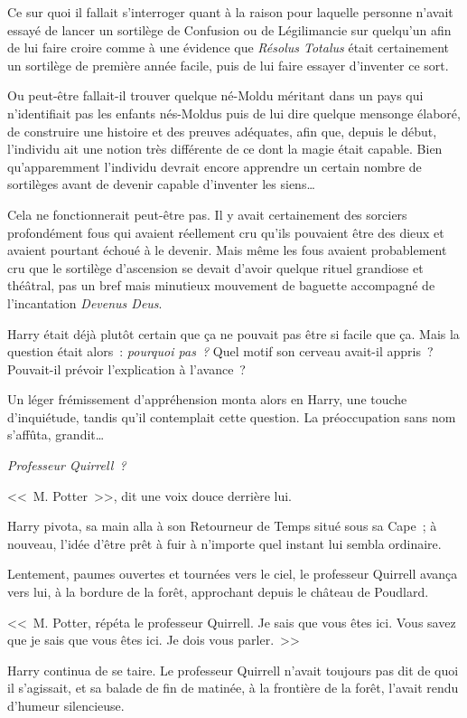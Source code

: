 Ce sur quoi il fallait s'interroger quant à la raison pour laquelle personne n'avait essayé de lancer un sortilège de Confusion ou de Légilimancie sur quelqu'un afin de lui faire croire comme à une évidence que \emph{Résolus Totalus} était certainement un sortilège de première année facile, puis de lui faire essayer d'inventer ce sort.

Ou peut-être fallait-il trouver quelque né-Moldu méritant dans un pays qui n'identifiait pas les enfants nés-Moldus puis de lui dire quelque mensonge élaboré, de construire une histoire et des preuves adéquates, afin que, depuis le début, l'individu ait une notion très différente de ce dont la magie était capable. Bien qu'apparemment l'individu devrait encore apprendre un certain nombre de sortilèges avant de devenir capable d'inventer les siens…

Cela ne fonctionnerait peut-être pas. Il y avait certainement des sorciers profondément fous qui avaient réellement cru qu'ils pouvaient être des dieux et avaient pourtant échoué à le devenir. Mais même les fous avaient probablement cru que le sortilège d'ascension se devait d'avoir quelque rituel grandiose et théâtral, pas un bref mais minutieux mouvement de baguette accompagné de l'incantation \emph{Devenus Deus}.

Harry était déjà plutôt certain que ça ne pouvait pas être si facile que ça. Mais la question était alors~: \emph{pourquoi pas~?} Quel motif son cerveau avait-il appris~? Pouvait-il prévoir l'explication à l'avance~?

Un léger frémissement d'appréhension monta alors en Harry, une touche d'inquiétude, tandis qu'il contemplait cette question. La préoccupation sans nom s'affûta, grandit…

\emph{Professeur Quirrell~?}

<<~M. Potter~>>, dit une voix douce derrière lui.

Harry pivota, sa main alla à son Retourneur de Temps situé sous sa Cape~; à nouveau, l'idée d'être prêt à fuir à n'importe quel instant lui sembla ordinaire.

Lentement, paumes ouvertes et tournées vers le ciel, le professeur Quirrell avança vers lui, à la bordure de la forêt, approchant depuis le château de Poudlard.

<<~M. Potter, répéta le professeur Quirrell. Je sais que vous êtes ici. Vous savez que je sais que vous êtes ici. Je dois vous parler.~>>

Harry continua de se taire. Le professeur Quirrell n'avait toujours pas dit de quoi il s'agissait, et sa balade de fin de matinée, à la frontière de la forêt, l'avait rendu d'humeur silencieuse.

